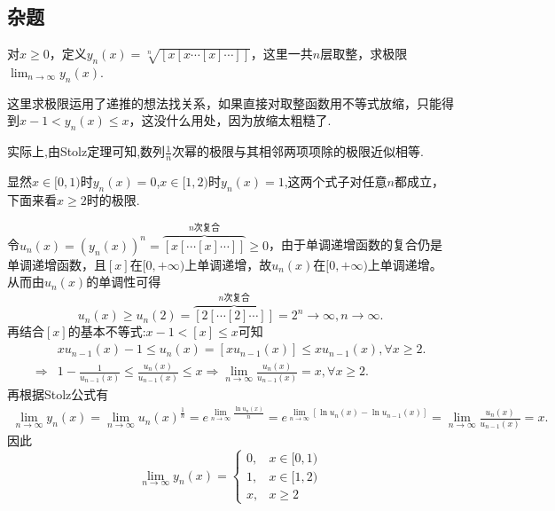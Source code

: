 \documentclass[lang=cn,newtx,10pt,scheme=chinese]{elegantbook}
\begin{document}
\subsection{杂题}

\begin{example}
对\(x\geq0\)，定义\(y_n(x)=\sqrt[n]{[x[x\cdots[x]\cdots]]}\)，这里一共\(n\)层取整，求极限\(\lim_{n\rightarrow\infty}y_n(x)\).
\end{example}
\begin{note}
   这里求极限运用了递推的想法找关系，如果直接对取整函数用不等式放缩，只能得到\(x - 1<y_n(x)\leq x\)，这没什么用处，因为放缩太粗糙了.

   实际上,由Stolz定理可知,数列$\frac{1}{n}$次幂的极限与其相邻两项项除的极限近似相等.
\end{note}
\begin{solution}
   显然\(x\in[0,1)\)时\(y_n(x)=0\),\(x\in[1,2)\)时\(y_n(x)=1\),这两个式子对任意\(n\)都成立，下面来看\(x\geq2\)时的极限.
   
   令\(u_n(x) = (y_n(x))^n=\overbrace{[x[\cdots [x]\cdots ]]}^{n\text{次复合}}\geqslant 0\)，由于单调递增函数的复合仍是单调递增函数，且\([x]\)在\([0, +\infty)\)上单调递增，故\(u_n(x)\)在\([0, +\infty)\)上单调递增。
   从而由\(u_n(x)\)的单调性可得
   \[
   u_n(x) \geqslant u_n(2)=\overbrace{[2[\cdots [2]\cdots ]]}^{n\text{次复合}} = 2^n\rightarrow \infty, n\rightarrow \infty.
   \]
   再结合\([x]\)的基本不等式:$x-1<\left[ x \right] \leqslant x$可知
\begin{align*}
   &xu_{n-1}(x)-1\le u_n(x)=[xu_{n-1}(x)]\le xu_{n-1}(x),\forall x\ge 2.
   \\
   \Rightarrow &1-\frac{1}{u_{n-1}(x)}\le \frac{u_n(x)}{u_{n-1}(x)}\le x\Rightarrow \lim_{n\rightarrow \infty} \frac{u_n(x)}{u_{n-1}(x)}=x,\forall x\ge 2.
\end{align*}
再根据Stolz公式有
\begin{align*}
   \lim_{n\rightarrow \infty} y_n(x)=\lim_{n\rightarrow \infty} u_n(x)^{\frac{1}{n}}=e^{\lim\limits_{n\rightarrow \infty} \frac{\ln u_n(x)}{n}}=e^{\lim\limits_{n\rightarrow \infty} [\ln u_n(x)-\ln u_{n-1}(x)]}=\lim_{n\rightarrow \infty} \frac{u_n(x)}{u_{n-1}(x)}=x.
\end{align*}
因此
\[ 
\lim_{n\rightarrow\infty}y_n(x)=
\begin{cases}
0, & x\in[0,1)\\
1, & x\in[1,2)\\
x, & x\geq2
\end{cases}
\]
\end{solution}
\end{document}
